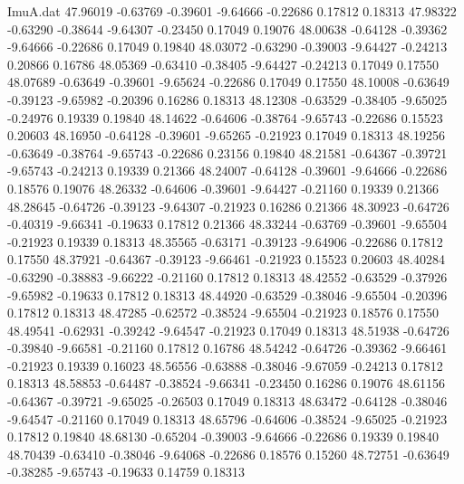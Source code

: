 \begin{filecontents}{ImuA.dat}
  47.96019   -0.63769   -0.39601   -9.64666   -0.22686    0.17812    0.18313
  47.98322   -0.63290   -0.38644   -9.64307   -0.23450    0.17049    0.19076
  48.00638   -0.64128   -0.39362   -9.64666   -0.22686    0.17049    0.19840
  48.03072   -0.63290   -0.39003   -9.64427   -0.24213    0.20866    0.16786
  48.05369   -0.63410   -0.38405   -9.64427   -0.24213    0.17049    0.17550
  48.07689   -0.63649   -0.39601   -9.65624   -0.22686    0.17049    0.17550
  48.10008   -0.63649   -0.39123   -9.65982   -0.20396    0.16286    0.18313
  48.12308   -0.63529   -0.38405   -9.65025   -0.24976    0.19339    0.19840
  48.14622   -0.64606   -0.38764   -9.65743   -0.22686    0.15523    0.20603
  48.16950   -0.64128   -0.39601   -9.65265   -0.21923    0.17049    0.18313
  48.19256   -0.63649   -0.38764   -9.65743   -0.22686    0.23156    0.19840
  48.21581   -0.64367   -0.39721   -9.65743   -0.24213    0.19339    0.21366
  48.24007   -0.64128   -0.39601   -9.64666   -0.22686    0.18576    0.19076
  48.26332   -0.64606   -0.39601   -9.64427   -0.21160    0.19339    0.21366
  48.28645   -0.64726   -0.39123   -9.64307   -0.21923    0.16286    0.21366
  48.30923   -0.64726   -0.40319   -9.66341   -0.19633    0.17812    0.21366
  48.33244   -0.63769   -0.39601   -9.65504   -0.21923    0.19339    0.18313
  48.35565   -0.63171   -0.39123   -9.64906   -0.22686    0.17812    0.17550
  48.37921   -0.64367   -0.39123   -9.66461   -0.21923    0.15523    0.20603
  48.40284   -0.63290   -0.38883   -9.66222   -0.21160    0.17812    0.18313
  48.42552   -0.63529   -0.37926   -9.65982   -0.19633    0.17812    0.18313
  48.44920   -0.63529   -0.38046   -9.65504   -0.20396    0.17812    0.18313
  48.47285   -0.62572   -0.38524   -9.65504   -0.21923    0.18576    0.17550
  48.49541   -0.62931   -0.39242   -9.64547   -0.21923    0.17049    0.18313
  48.51938   -0.64726   -0.39840   -9.66581   -0.21160    0.17812    0.16786
  48.54242   -0.64726   -0.39362   -9.66461   -0.21923    0.19339    0.16023
  48.56556   -0.63888   -0.38046   -9.67059   -0.24213    0.17812    0.18313
  48.58853   -0.64487   -0.38524   -9.66341   -0.23450    0.16286    0.19076
  48.61156   -0.64367   -0.39721   -9.65025   -0.26503    0.17049    0.18313
  48.63472   -0.64128   -0.38046   -9.64547   -0.21160    0.17049    0.18313
  48.65796   -0.64606   -0.38524   -9.65025   -0.21923    0.17812    0.19840
  48.68130   -0.65204   -0.39003   -9.64666   -0.22686    0.19339    0.19840
  48.70439   -0.63410   -0.38046   -9.64068   -0.22686    0.18576    0.15260
  48.72751   -0.63649   -0.38285   -9.65743   -0.19633    0.14759    0.18313

\end{filecontents}
